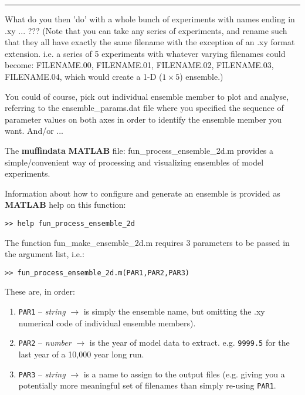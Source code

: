 \vspace{-2mm}
\noindent\rule{4cm}{0.5pt}
\vspace{2mm}

\noindent What do you then 'do' with a whole bunch of experiments with names ending in \textsf{\footnotesize .xy} ... ??? (Note that you can take any series of experiments, and rename such that they all have exactly the same filename with the exception of an \textsf{\footnotesize .xy} format extension. i.e. a series of 5 experiments with whatever varying filenames could become: \textsf{\footnotesize FILENAME.00}, \textsf{\footnotesize FILENAME.01}, \textsf{\footnotesize FILENAME.02}, \textsf{\footnotesize FILENAME.03}, \textsf{\footnotesize FILENAME.04}, which would create a 1-D (\(1\times 5\)) ensemble.)

You could of course, pick out individual ensemble member to plot and analyse, referring to the \textsf{\footnotesize ensemble\_params.dat} file where you specified the sequence of parameter values on both axes in order to identify the ensemble member you want. And/or ...

The \textbf{muffindata} \textbf{MATLAB} file: \textsf{\footnotesize fun\_process\_ensemble\_2d.m} provides a simple/convenient way of processing and visualizing ensembles of model experiments.

Information about how to configure and generate an ensemble is provided as \textbf{MATLAB} help on this function:
\vspace{-2mm}\begin{verbatim}
>> help fun_process_ensemble_2d
\end{verbatim}\vspace{-2mm}

The function \textsf{\footnotesize fun\_make\_ensemble\_2d.m} requires 3 parameters to be passed in the argument list, i.e.:
\vspace{-2mm}\begin{verbatim}
>> fun_process_ensemble_2d.m(PAR1,PAR2,PAR3)
\end{verbatim}\vspace{-2mm}
These are, in order:
\begin{enumerate}
\vspace{1mm}
\item \texttt{PAR1} -- \textit{string} \(\rightarrow\) is simply the ensemble name, but omitting the \textsf{\footnotesize .xy} numerical code of individual ensemble members). 
\vspace{1mm}
\item \texttt{PAR2} -- \textit{number} \(\rightarrow\) is the year of model data to extract. e.g. \texttt{9999.5} for the last year of a 10,000 year long run.
\vspace{1mm}
\item \texttt{PAR3} -- \textit{string} \(\rightarrow\) is a name to assign to the output files (e.g. giving you a potentially more meaningful set of filenames than simply re-using \texttt{PAR1}.
\end{enumerate}
\vspace{1mm}

